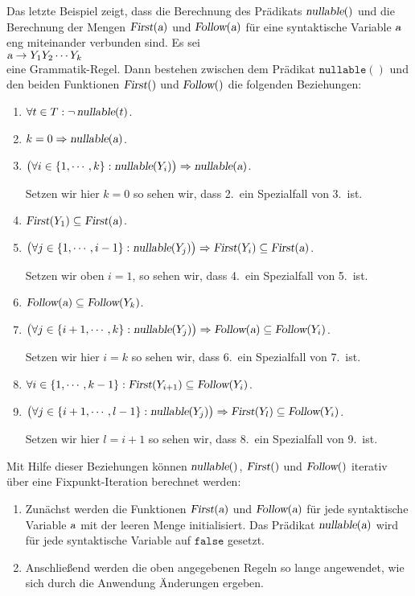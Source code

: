 \noindent
Das letzte Beispiel zeigt, dass die Berechnung des Pr\"adikats $\textsl{nullable}()$ 
und die Berechnung der Mengen $\textsl{First}(\textsl{a})$ und $\textsl{Follow}(\textsl{a})$ f\"ur eine syntaktische
Variable $\textsl{a}$ eng miteinander verbunden sind.  
Es sei
\\[0.2cm]
\hspace*{1.3cm}
 $\textsl{a} \rightarrow Y_1 Y_2 \cdots Y_k$ 
\\[0.2cm]
eine Grammatik-Regel.
Dann bestehen zwischen dem Pr\"adikat $\texttt{nullable}()$ und den beiden Funktionen
$\textsl{First}()$ und $\textsl{Follow}()$ die folgenden Beziehungen:
\begin{enumerate}
\item $\forall t \in T: \neg\, \textsl{nullable}(t)$.
\item $k = 0 \Rightarrow \textsl{nullable}(\textsl{a})$.
\item $\bigl(\forall i \in \{1, \cdots, k\}: \textsl{nullable}(Y_i)\bigr) \Rightarrow
       \textsl{nullable}(\textsl{a})$.

      Setzen wir hier $k=0$ so sehen wir, dass 2.~ein Spezialfall von 3.~ist.
\item $\textsl{First}(Y_1) \subseteq \textsl{First}(\textsl{a})$.
\item $\bigl(\forall j \in \{1,\cdots,i-1\}: \textsl{nullable}(Y_j)\bigr) \Rightarrow
       \textsl{First}(Y_i) \subseteq \textsl{First}(\textsl{a})$.

       Setzen wir oben $i=1$, so sehen wir, dass 4.~ein Spezialfall von 5.~ist.
\item $\textsl{Follow}(\textsl{a}) \subseteq \textsl{Follow}(Y_k)$.
\item $\bigl(\forall j \in \{i+1, \cdots, k\}: \textsl{nullable}(Y_j)\bigr) \Rightarrow 
       \textsl{Follow}(\textsl{a}) \subseteq \textsl{Follow}(Y_i)$.

      Setzen wir hier $i=k$ so sehen wir, dass 6.~ein Spezialfall von 7.~ist.
\item $\forall i \in \{1,\cdots,k-1\}:\textsl{First}(Y_{i+1}) \subseteq \textsl{Follow}(Y_i)$.
\item $\bigl(\forall j \in \{i+1, \cdots, l-1\}: \textsl{nullable}(Y_j)\bigr) \Rightarrow 
       \textsl{First}(Y_l) \subseteq \textsl{Follow}(Y_i)$.

      Setzen wir hier $l=i+1$ so sehen wir, dass 8.~ein Spezialfall von 9.~ist.
\end{enumerate}
Mit Hilfe dieser Beziehungen k\"onnen $\textsl{nullable}()$, $\textsl{First}()$ und
$\textsl{Follow}()$ iterativ \"uber eine Fixpunkt-Iteration berechnet werden:  
\begin{enumerate}
\item Zun\"achst werden die Funktionen $\textsl{First}(\textsl{a})$ und
      $\textsl{Follow}(\textsl{a})$ f\"ur jede syntaktische Variable $\textsl{a}$ mit der leeren Menge initialisiert.
      Das Pr\"adikat $\textsl{nullable}(\textsl{a})$ wird f\"ur jede syntaktische Variable auf $\texttt{false}$
      gesetzt.
\item Anschlie{\ss}end werden die oben angegebenen Regeln so lange angewendet, wie sich durch die
      Anwendung \"Anderungen ergeben. 
\end{enumerate}

